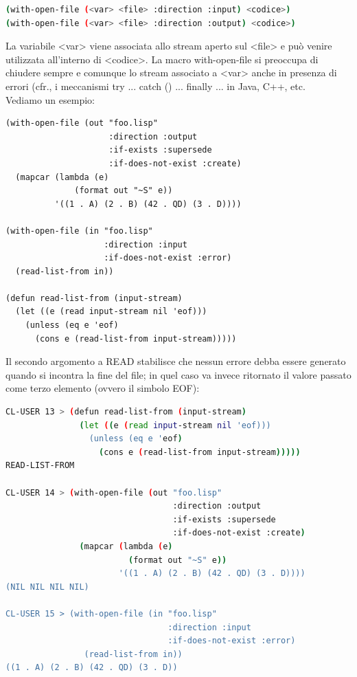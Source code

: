 \documentclass[a4paper,12pt, oneside]{book}
\begin{document}
\begin{shaded}
\begin{lstlisting}[language=bash]
(with-open-file (<var> <file> :direction :input) <codice>)
(with-open-file (<var> <file> :direction :output) <codice>)
\end{lstlisting}
\end{shaded}
La variabile <var> viene associata allo stream aperto sul <file> e può venire
utilizzata all'interno di <codice>. La macro with-open-file si preoccupa di chiudere sempre e comunque lo
stream associato a <var> anche in presenza di errori (cfr., i meccanismi try
{...} catch () {...} finally {...} in Java, C++, etc. \\
Vediamo un esempio:
\begin{verbatim}
(with-open-file (out "foo.lisp"
                     :direction :output
                     :if-exists :supersede
                     :if-does-not-exist :create)
  (mapcar (lambda (e)
              (format out "~S" e))
          '((1 . A) (2 . B) (42 . QD) (3 . D))))
          
(with-open-file (in "foo.lisp"
                    :direction :input
                    :if-does-not-exist :error)
  (read-list-from in))
  
(defun read-list-from (input-stream)
  (let ((e (read input-stream nil 'eof)))
    (unless (eq e 'eof)
      (cons e (read-list-from input-stream)))))
\end{verbatim}
Il secondo argomento a READ stabilisce che nessun errore debba essere generato quando
si incontra la fine del file; in quel caso va invece ritornato il valore passato come terzo
elemento (ovvero il simbolo EOF):
\begin{shaded}
\begin{lstlisting}[language=bash]
CL-USER 13 > (defun read-list-from (input-stream)
               (let ((e (read input-stream nil 'eof)))
                 (unless (eq e 'eof)
                   (cons e (read-list-from input-stream)))))
READ-LIST-FROM

CL-USER 14 > (with-open-file (out "foo.lisp"
                                  :direction :output
                                  :if-exists :supersede
                                  :if-does-not-exist :create)
               (mapcar (lambda (e)
                         (format out "~S" e))
                       '((1 . A) (2 . B) (42 . QD) (3 . D))))
(NIL NIL NIL NIL)

CL-USER 15 > (with-open-file (in "foo.lisp"
                                 :direction :input
                                 :if-does-not-exist :error)
                (read-list-from in))
((1 . A) (2 . B) (42 . QD) (3 . D))
\end{lstlisting}
\end{shaded}
\end{document}

